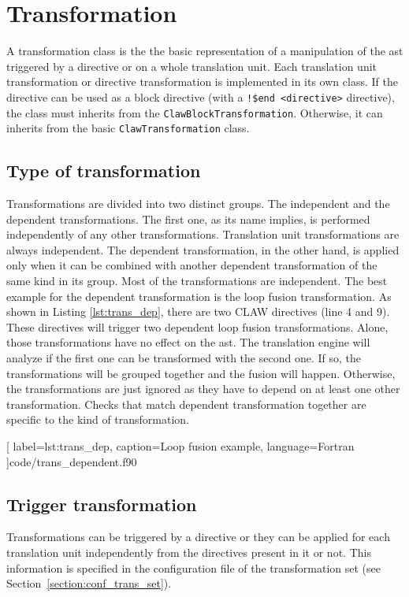 \chapter{Transformation}
\label{chapter:transformation}
A transformation class is the the basic representation of a manipulation of the
\gls{ast} triggered by a directive or on a whole translation unit. Each 
translation unit transformation or directive transformation is implemented in
its own class. If the directive can be used as a block directive (with a
\lstinline|!$end <directive>| directive), the class must inherits from the
\lstinline!ClawBlockTransformation!. Otherwise, it can inherits from the basic
\lstinline!ClawTransformation! class.

\section{Type of transformation}
\label{section:trans_type}
Transformations are divided into two distinct groups. The independent and the
dependent transformations. The first one, as its name implies, is performed
independently of any other transformations. Translation unit transformations 
are always independent. The dependent transformation, in the
other hand, is applied only when it can be combined with another dependent
transformation of the same kind in its group. Most of the transformations are
independent. The best example for the dependent transformation is the loop
fusion transformation. As shown in Listing \ref{lst:trans_dep}, there are two
CLAW directives (line 4 and 9). These directives will trigger two dependent loop
fusion transformations. Alone, those transformations have no effect
on the \gls{ast}. The translation engine will analyze if the
first one can be transformed with the second one. If so, the transformations 
will be grouped together and the fusion will happen. Otherwise, the 
transformations are just ignored as they have to depend on at least one other 
transformation. Checks that match dependent transformation together are 
specific to the kind of transformation.


  [
    label=lst:trans_dep,
    caption=Loop fusion example,
    language=Fortran
  ]{code/trans_dependent.f90}

\section{Trigger transformation}
\label{section:trans_trigger}
Transformations can be triggered by a directive or they can be applied for each
translation unit independently from the directives present in it or not.
This information is specified in the configuration file of the transformation
set (see Section~\ref{section:conf_trans_set}).


